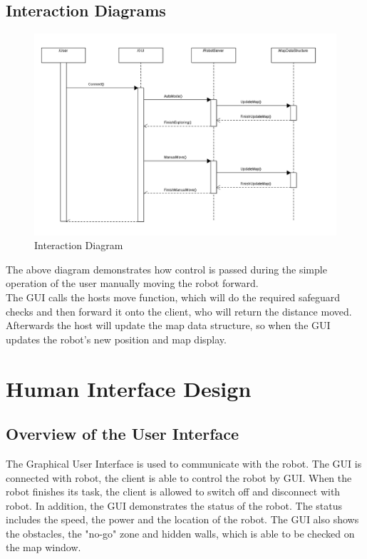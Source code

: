 \documentclass[11pt, a4paper]{report}
\begin{document}
\section{Interaction Diagrams}
\begin{figure}[h]
  \centering
    \includegraphics[width=16cm]{SEP_13_Sequence_Diagram.png}
  \caption{Interaction Diagram}
\end{figure}
The above diagram demonstrates how control is passed during the simple operation of the user manually moving the robot forward.
\\The GUI calls the hosts move function, which will do the required safeguard checks and then forward it onto the client, who will return the distance moved.
\\Afterwards the host will update the map data structure, so when the GUI updates the robot's new position and map display.

\pagebreak


\chapter{Human Interface Design}%
\label{cha:HID}

\section{Overview of the User Interface}
The Graphical User Interface is used to communicate with the robot. The GUI is connected with robot, the client is able to control the robot by GUI. When the robot finishes its task, the client is allowed to switch off and disconnect with robot. In addition, the GUI demonstrates the status of the robot. The status includes the speed, the power and the location of the robot. The GUI also shows the obstacles, the "no-go" zone and hidden walls, which is able to be checked on the map window.\\
\end{document}
